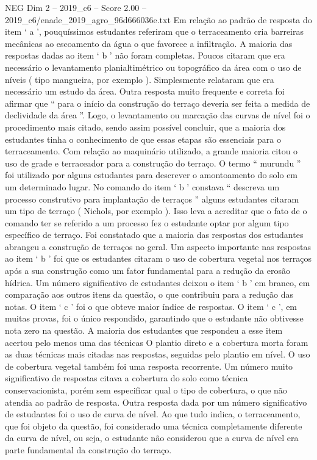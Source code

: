 \begin{textsample}{NEG Dim 2 – 2019\_c6 – Score 2.00 – 2019\_c6/enade\_2019\_agro\_96d666036e.txt}
Em relação ao padrão de resposta do item ‘ a ’, pouquíssimos estudantes referiram que o terraceamento cria barreiras mecânicas ao escoamento da água o que favorece a infiltração.
A maioria das respostas dadas ao item ‘ b ’ não foram completas.
Poucos citaram que era necessário o levantamento planialtimétrico ou topográfico da área com o uso de níveis ( tipo mangueira, por exemplo ).
Simplesmente relataram que era necessário um estudo da área.
Outra resposta muito frequente e correta foi afirmar que “ para o início da construção do terraço deveria ser feita a medida de declividade da área ”.
Logo, o levantamento ou marcação das curvas de nível foi o procedimento mais citado, sendo assim possível concluir, que a maioria dos estudantes tinha o conhecimento de que essas etapas são essenciais para o terraceamento.
Com relação ao maquinário utilizado, a grande maioria citou o uso de grade e terraceador para a construção do terraço.
O termo “ murundu ” foi utilizado por alguns estudantes para descrever o amontoamento do solo em um determinado lugar.
No comando do item ‘ b ’ constava “ descreva um processo construtivo para implantação de terraços ” alguns estudantes citaram um tipo de terraço ( Nichols, por exemplo ).
Isso leva a acreditar que o fato de o comando ter se referido a um processo fez o estudante optar por algum tipo específico de terraço.
Foi constatado que a maioria das respostas dos estudantes abrangeu a construção de terraços no geral.
Um aspecto importante nas respostas ao item ‘ b ’ foi que os estudantes citaram o uso de cobertura vegetal nos terraços após a sua construção como um fator fundamental para a redução da erosão hídrica.
Um número significativo de estudantes deixou o item ‘ b ’ em branco, em comparação aos outros itens da questão, o que contribuiu para a redução das notas.
O item ‘ c ’ foi o que obteve maior índice de respostas.
O item ‘ c ’, em muitas provas, foi o único respondido, garantindo que o estudante não obtivesse nota zero na questão.
A maioria dos estudantes que respondeu a esse item acertou pelo menos uma das técnicas O plantio direto e a cobertura morta foram as duas técnicas mais citadas nas respostas, seguidas pelo plantio em nível.
O uso de cobertura vegetal também foi uma resposta recorrente.
Um número muito significativo de respostas citava a cobertura do solo como técnica conservacionista, porém sem especificar qual o tipo de cobertura, o que não atendia ao padrão de resposta.
Outra resposta dada por um número significativo de estudantes foi o uso de curva de nível.
Ao que tudo indica, o terraceamento, que foi objeto da questão, foi considerado uma técnica completamente diferente da curva de nível, ou seja, o estudante não considerou que a curva de nível era parte fundamental da construção do terraço.

\end{textsample}

